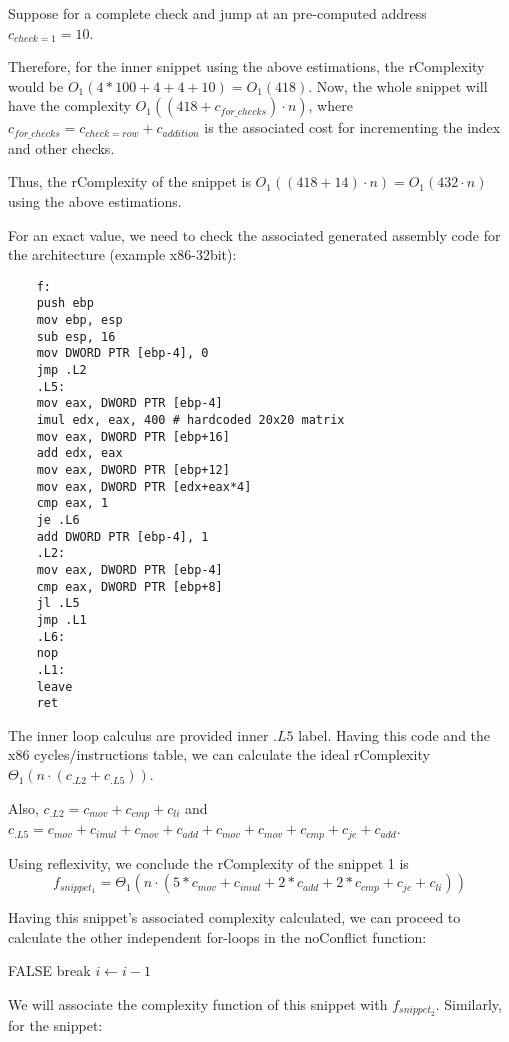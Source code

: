Suppose for a complete check and jump at an pre-computed address $c_{check=1} = 10$.

Therefore, for the inner snippet using the above estimations, the rComplexity would be $O_{1}(4 * 100 + 4 + 4 + 10) = O_{1}(418)$. Now, the whole snippet will have the complexity $O_{1}((418 + c_{for\_checks}) \cdot n)$, where  $c_{for\_checks} = c_{check=row} + c_{addition}$ is the associated cost for incrementing the index and other checks.

Thus, the rComplexity of the snippet is $O_{1}((418 + 14) \cdot n) = O_{1}(432 \cdot n)$ using the above estimations.


For an exact value, we need to check the associated generated assembly code for the architecture (example x86-32bit):
\begin{verbatim}
    f:
    push ebp
    mov ebp, esp
    sub esp, 16
    mov DWORD PTR [ebp-4], 0
    jmp .L2
    .L5:
    mov eax, DWORD PTR [ebp-4]
    imul edx, eax, 400 # hardcoded 20x20 matrix
    mov eax, DWORD PTR [ebp+16]
    add edx, eax
    mov eax, DWORD PTR [ebp+12]
    mov eax, DWORD PTR [edx+eax*4]
    cmp eax, 1
    je .L6
    add DWORD PTR [ebp-4], 1
    .L2:
    mov eax, DWORD PTR [ebp-4]
    cmp eax, DWORD PTR [ebp+8]
    jl .L5
    jmp .L1
    .L6:
    nop
    .L1:
    leave
    ret
\end{verbatim}


The inner loop calculus are provided inner $.L5$ label. Having this code and the x86 cycles/instructions table, we can calculate the ideal rComplexity $\Theta_{1}(n \cdot (c_{.L2} + c_{.L5}))$.

Also, $c_{.L2} = c_{mov} + c_{cmp} + c_{li}$ and $c_{.L5} = c_{mov} + c_{imul} + c_{mov} + c_{add} + c_{mov} + c_{mov} + c_{cmp} + c_{je} + c_{add} $.

Using reflexivity, we conclude the rComplexity of the snippet 1 is \[f_{snippet_{1}} =  \Theta_{1}(n \cdot ( 5 * c_{mov} + c_{imul} + 2 * c_{add} +2 *  c_{cmp} + c_{je} + c_{li}))\]

Having this snippet's associated complexity calculated, we can proceed to calculate the other independent for-loops in the noConflict function:
\begin{algorithmic}[1]
    \State \Return FALSE
    \EndIf
    \State break
    \EndIf
    \State $i \gets i-1$
    \EndFor
\end{algorithmic}
We will associate the complexity function of this snippet with $f_{snippet_{2}}$. Similarly, for the snippet:

